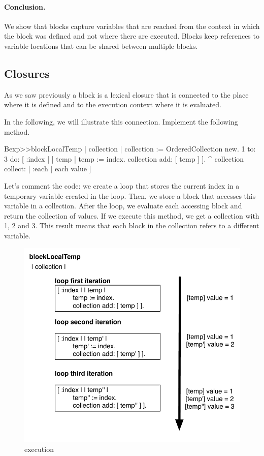 \documentclass[a4paper,10pt,twoside]{book}
\begin{document}
\paragraph{Conclusion.} We show that blocks capture variables that are reached from the context in which the block was defined and not where there are executed. Blocks keep references to variable locations that can be shared between multiple blocks. 


\subsection{Closures}

As we saw previously a block is a lexical closure that is connected to the place where it is defined and to the execution context where it is evaluated. 

In the following, we will illustrate this connection. Implement the following method.

\begin{code}{}
Bexp>>blockLocalTemp
	| collection |
	collection := OrderedCollection new.
	1 to: 3 do: [ :index |
		| temp |
		temp := index.
		collection add: [ temp ] ].
	^ collection collect: [ :each | each value ]
\end{code}

Let's comment the code: we create a loop that stores the current index in a temporary variable  created in the loop. Then, we store a block that accesses this variable in a collection. After the loop, we evaluate each accessing block and return the collection of values. If we execute this method, we get a collection with 1, 2 and 3. This result means that each block in the collection refers to a different  variable.

\begin{figure}
	\centering
        \includegraphics[width=0.7\linewidth]{blockClosureLocalTemp}
	\caption{ execution}
	\label{fig:blockLocalTempExecution}
\end{figure}
\end{document}

